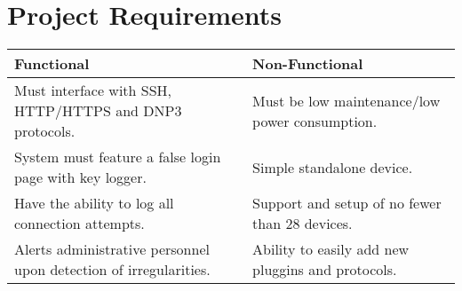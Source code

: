 \section*{\color{NavyBlue}Project Requirements}

\large

\begin{center}
\setlength{\tabcolsep}{18pt}
\renewcommand{\arraystretch}{1.4}
\begin{tabularx}{\linewidth}{X X}
\textbf{Functional} & \textbf{Non-Functional} \\
\midrule
Must interface with SSH, HTTP/HTTPS and DNP3 protocols. & Must be low maintenance/low power consumption. \\
System must feature a false login page with key logger. & Simple standalone device. \\
Have the ability to log all connection attempts. & Support and setup of no fewer than 28 devices. \\
Alerts administrative personnel upon detection of irregularities. & Ability to easily add new pluggins and protocols. \\
\end{tabularx}
\end{center}
